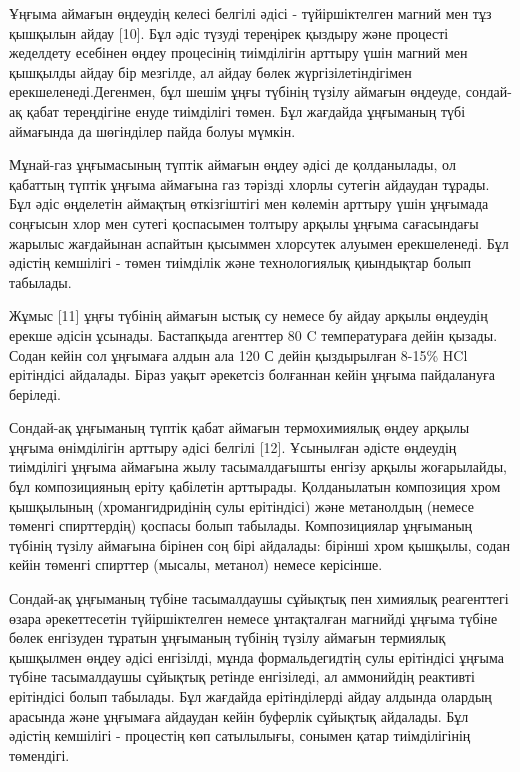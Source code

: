 \begin{multicols}{2}
Ұңғыма аймағын өңдеудің келесі белгілі әдісі - түйіршіктелген магний мен
тұз қышқылын айдау {[}10{]}. Бұл әдіс түзуді тереңірек қыздыру және
процесті жеделдету есебінен өңдеу процесінің тиімділігін арттыру үшін
магний мен қышқылды айдау бір мезгілде, ал айдау бөлек
жүргізілетіндігімен ерекшеленеді.Дегенмен, бұл шешім ұңғы түбінің түзілу
аймағын өңдеуде, сондай-ақ қабат тереңдігіне енуде тиімділігі төмен. Бұл
жағдайда ұңғыманың түбі аймағында да шөгінділер пайда болуы мүмкін.

Мұнай-газ ұңғымасының түптік аймағын өңдеу әдісі де қолданылады, ол
қабаттың түптік ұңғыма аймағына газ тәрізді хлорлы сутегін айдаудан
тұрады. Бұл әдіс өңделетін аймақтың өткізгіштігі мен көлемін арттыру
үшін ұңғымада соңғысын хлор мен сутегі қоспасымен толтыру арқылы ұңғыма
сағасындағы жарылыс жағдайынан аспайтын қысыммен хлорсутек алуымен
ерекшеленеді. Бұл әдістің кемшілігі - төмен тиімділік және технологиялық
қиындықтар болып табылады.

Жұмыс {[}11{]} ұңғы түбінің аймағын ыстық су немесе бу айдау арқылы
өңдеудің ерекше әдісін ұсынады. Бастапқыда агенттер 80
C температураға дейін қызады. Содан кейін сол
ұңғымаға алдын ала 120 С дейін қыздырылған 8-15\% HCl
ерітіндісі айдалады. Біраз уақыт әрекетсіз болғаннан кейін ұңғыма
пайдалануға беріледі.

Сондай-ақ ұңғыманың түптік қабат аймағын термохимиялық өңдеу арқылы
ұңғыма өнімділігін арттыру әдісі белгілі {[}12{]}. Ұсынылған әдісте
өңдеудің тиімділігі ұңғыма аймағына жылу тасымалдағышты енгізу арқылы
жоғарылайды, бұл композицияның еріту қабілетін арттырады. Қолданылатын
композиция хром қышқылының (хромангидридінің сулы ерітіндісі) және
метанолдың (немесе төменгі спирттердің) қоспасы болып табылады.
Композициялар ұңғыманың түбінің түзілу аймағына бірінен соң бірі
айдалады: бірінші хром қышқылы, содан кейін төменгі спирттер (мысалы,
метанол) немесе керісінше.

Сондай-ақ ұңғыманың түбіне тасымалдаушы сұйықтық пен химиялық
реагенттегі өзара әрекеттесетін түйіршіктелген немесе ұнтақталған
магнийді ұңғыма түбіне бөлек енгізуден тұратын ұңғыманың түбінің түзілу
аймағын термиялық қышқылмен өңдеу әдісі енгізілді, мұнда формальдегидтің
сулы ерітіндісі ұңғыма түбіне тасымалдаушы сұйықтық ретінде енгізіледі,
ал аммонийдің реактивті ерітіндісі болып табылады. Бұл жағдайда
ерітінділерді айдау алдында олардың арасында және ұңғымаға айдаудан
кейін буферлік сұйықтық айдалады. Бұл әдістің кемшілігі - процестің көп
сатылылығы, сонымен қатар тиімділігінің төмендігі.


\end{multicols}
